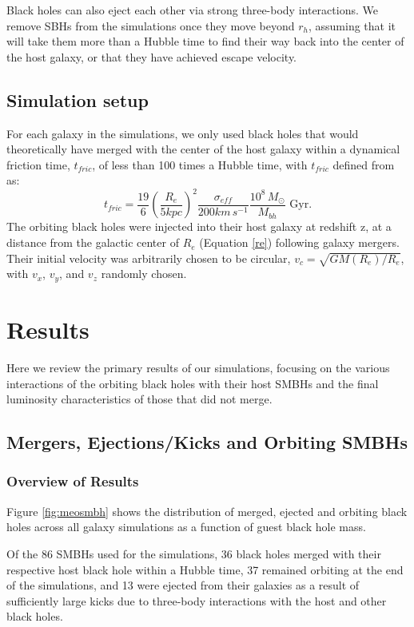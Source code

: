 \documentclass[english, apj]{emulateapj}
\begin{document}
Black holes can also eject each other via strong three-body interactions. We remove SBHs from the simulations once they move beyond $r_h$, assuming that it will take them more than a Hubble time to find their way back into the center of the host galaxy, or that they have achieved escape velocity.

\subsection{Simulation setup}
For each galaxy in the simulations, we only used black holes that would theoretically have merged with the center of the host galaxy within a dynamical friction time, $t_{fric}$, of less than 100 times a Hubble time, with $t_{fric}$ defined from \citet{2008gady.book.....B} as:
\begin{equation}\label{tfric}
    t_{fric} = \frac{19}{6}\left(\frac{R_e}{5kpc}\right)^2\frac{\sigma_{eff}}{200km\,s^{-1}}\frac{10^8\,M_{\odot}}{M_{bh}} \text{  Gyr}.
\end{equation}
The orbiting black holes were injected into their host galaxy at redshift z, at a distance from the galactic center of $R_{e}$ (Equation \ref{re}) following galaxy mergers.  Their initial velocity was arbitrarily chosen to be circular, $v_c = \sqrt{GM(R_e)/R_e}$, with $v_x$, $v_y$, and $v_z$ randomly chosen.

\section{Results}\label{sec:results}
Here we review the primary results of our simulations, focusing on the various interactions of the orbiting black holes with their host SMBHs and the final luminosity characteristics of those that did not merge.

\subsection{Mergers, Ejections/Kicks and Orbiting SMBHs}

\subsubsection{Overview of Results}\label{sec:results_overview}
Figure \ref{fig:meosmbh} shows the distribution of merged, ejected and orbiting black holes across all galaxy simulations as a function of guest black hole mass.

Of the 86 SMBHs used for the simulations, 36 black holes merged with their respective host black hole within a Hubble time, 37 remained orbiting at the end of the simulations, and 13 were ejected from their galaxies as a result of sufficiently large kicks due to three-body interactions with the host and other black holes.
\end{document}
